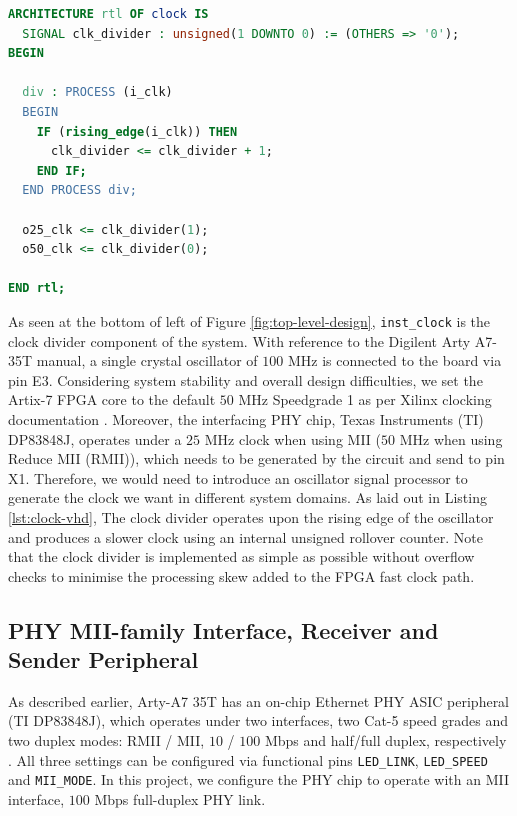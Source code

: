 \documentclass[a4paper]{report}
\newcommand{\code}{\texttt}
\begin{document}
\begin{lstlisting}[language=VHDL, caption=Snippet of Clock Divider \code{clock.vhd}, label={lst:clock-vhd}]
ARCHITECTURE rtl OF clock IS
  SIGNAL clk_divider : unsigned(1 DOWNTO 0) := (OTHERS => '0');
BEGIN

  div : PROCESS (i_clk)
  BEGIN
    IF (rising_edge(i_clk)) THEN
      clk_divider <= clk_divider + 1;
    END IF;
  END PROCESS div;

  o25_clk <= clk_divider(1);
  o50_clk <= clk_divider(0);
 
END rtl;
\end{lstlisting}

As seen at the bottom of left of Figure \ref{fig:top-level-design}, \code{inst\_clock} is the clock divider component of the system. With reference to the Digilent Arty A7-35T manual\cite{digilent-arty}, a single crystal oscillator of $100$ MHz is connected to the board via pin E3. Considering system stability and overall design difficulties, we set the Artix-7 FPGA core to the default $50$ MHz Speedgrade 1 as per Xilinx clocking documentation \cite{xilinx-7-clocking}. Moreover, the interfacing PHY chip, Texas Instruments (TI) DP83848J, operates under a $25$ MHz clock when using MII ($50$ MHz when using Reduce MII (RMII)), which needs to be generated by the circuit and send to pin X1\cite{texas-instruments-dp83848x}. Therefore, we would need to introduce an oscillator signal processor to generate the clock we want in different system domains. As laid out in Listing \ref{lst:clock-vhd}, The clock divider operates upon the rising edge of the oscillator and produces a slower clock using an internal unsigned rollover counter. Note that the clock divider is implemented as simple as possible without overflow checks to minimise the processing skew added to the FPGA fast clock path.

\subsection{PHY MII-family Interface, Receiver and Sender Peripheral}
\label{section:implementation-hardware-implementation-phy-mac-peripheral}

As described earlier, Arty-A7 35T has an on-chip Ethernet PHY ASIC peripheral (TI DP83848J), which operates under two interfaces, two Cat-5 speed grades and two duplex modes: RMII / MII, $10$ / $100$ Mbps and half/full duplex, respectively \cite{texas-instruments-dp83848x}. All three settings can be configured via functional pins \code{LED\_LINK}, \code{LED\_SPEED} and \code{MII\_MODE}. In this project, we configure the PHY chip to operate with an MII interface, $100$ Mbps full-duplex PHY link.
\end{document}
